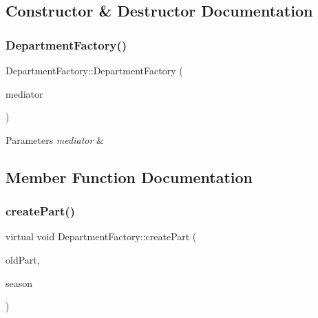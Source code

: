 \subsection{Constructor \& Destructor Documentation}
\mbox{\label{classDepartmentFactory_a94d9bd9fa828f2a04f3b89700007befe}} 
\subsubsection{\texorpdfstring{Department\+Factory()}{DepartmentFactory()}}
{\footnotesize\ttfamily Department\+Factory\+::\+Department\+Factory (\begin{DoxyParamCaption}\item[{\hyperlink{classDepartmentMediator}{Department\+Mediator} $\ast$}]{mediator }\end{DoxyParamCaption})}


\begin{DoxyParams}{Parameters}
{\em mediator} & \\
\hline
\end{DoxyParams}


\subsection{Member Function Documentation}
\mbox{\label{classDepartmentFactory_a6080a560efb9fe0b9c870db5a7358886}} 
\subsubsection{\texorpdfstring{create\+Part()}{createPart()}}
{\footnotesize\ttfamily virtual void Department\+Factory\+::create\+Part (\begin{DoxyParamCaption}\item[{\hyperlink{classDepartmentOutput}{Department\+Output} $\ast$}]{old\+Part,  }\item[{string}]{season }\end{DoxyParamCaption})\hspace{0.3cm}{\ttfamily [pure virtual]}}


